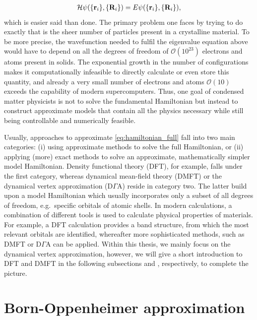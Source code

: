 \documentclass[../../main.tex]{subfiles}
\begin{document}
\begin{align}
	\mathcal{H}\psi(\{\textbf{r}_i\},\{\textbf{R}_i\})=E\psi(\{\textbf{r}_i\},\{\textbf{R}_i\}),
\end{align}
which is easier said than done. The primary problem one faces by trying to do exactly that is the sheer number of particles present in a crystalline material. To be more precise, the wavefunction needed to fulfil the eigenvalue equation above would have to depend on all the degrees of freedom of $\mathcal{O}(10^{23})$ electrons and atoms present in solids. The exponential growth in the number of configurations makes it computationally infeasible to directly calculate or even store this quantity, and already a very small number of electrons and atoms $\mathcal{O}(10)$ exceeds the capability of modern supercomputers. Thus, one goal of condensed matter physicists is not to solve the fundamental Hamiltonian but instead to construct approximate models that contain all the physics necessary while still being controllable and numerically feasible.

Usually, approaches to approximate \eqref{eq:hamiltonian_full} fall into two main categories: (i) using approximate methods to solve the full Hamiltonian, or (ii) applying (more) exact methods to solve an approximate, mathematically simpler model Hamiltonian. Density functional theory (DFT), for example, falls under the first category, whereas dynamical mean-field theory (DMFT) or the dynamical vertex approximation ($\text{D}\Gamma\text{A}$) reside in category two. The latter build upon a model Hamiltonian which usually incorporates only a subset of all degrees of freedom, e.g.\ specific orbitals of atomic shells. In modern calculations, a combination of different tools is used to calculate physical properties of materials. For example, a DFT calculation provides a band structure, from which the most relevant orbitals are identified, whereafter more sophisticated methods, such as DMFT or $\text{D}\Gamma\text{A}$ can be applied. Within this thesis, we mainly focus on the dynamical vertex approximation, however, we will give a short introduction to DFT and DMFT in the following subsections and , respectively, to complete the picture. 

\section{Born-Oppenheimer approximation}
\end{document}
